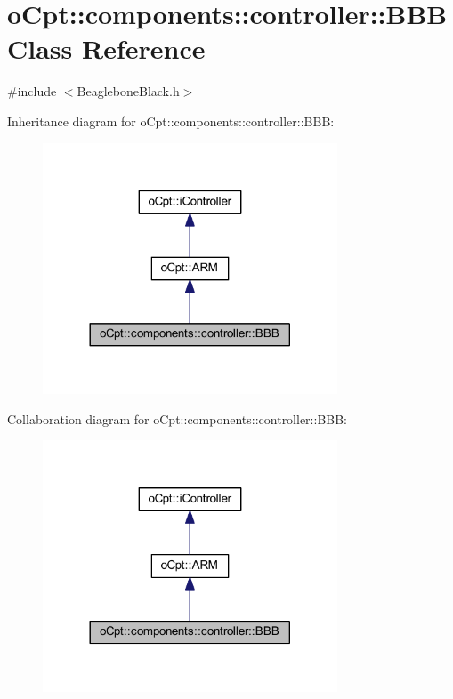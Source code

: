 \hypertarget{classo_cpt_1_1components_1_1controller_1_1_b_b_b}{}\section{o\+Cpt\+:\+:components\+:\+:controller\+:\+:B\+BB Class Reference}
\label{classo_cpt_1_1components_1_1controller_1_1_b_b_b}


{\ttfamily \#include $<$Beaglebone\+Black.\+h$>$}



Inheritance diagram for o\+Cpt\+:\+:components\+:\+:controller\+:\+:B\+BB\+:
\nopagebreak
\begin{figure}[H]
\begin{center}
\leavevmode
\includegraphics[width=248pt]{classo_cpt_1_1components_1_1controller_1_1_b_b_b__inherit__graph}
\end{center}
\end{figure}


Collaboration diagram for o\+Cpt\+:\+:components\+:\+:controller\+:\+:B\+BB\+:
\nopagebreak
\begin{figure}[H]
\begin{center}
\leavevmode
\includegraphics[width=248pt]{classo_cpt_1_1components_1_1controller_1_1_b_b_b__coll__graph}
\end{center}
\end{figure}
